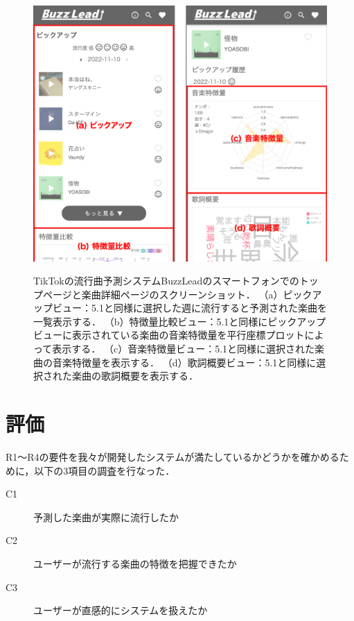 \documentclass[titlepage]{jsreport}
\begin{document}
\begin{figure}[htb]
\begin{center}
\includegraphics[width=120mm]{images/BuzzLead_sp.png}
\label{fig:smartphon}
\caption{
  TikTokの流行曲予測システムBuzzLeadのスマートフォンでのトップページと楽曲詳細ページのスクリーンショット．
  （a）ピックアップビュー：5.1と同様に選択した週に流行すると予測された楽曲を一覧表示する．
  （b）特徴量比較ビュー：5.1と同様にピックアップビューに表示されている楽曲の音楽特徴量を平行座標プロットによって表示する．
  （c）音楽特徴量ビュー：5.1と同様に選択された楽曲の音楽特徴量を表示する．
  （d）歌詞概要ビュー：5.1と同様に選択された楽曲の歌詞概要を表示する．
}
\end{center}
\end{figure}



\chapter{評価}
R1〜R4の要件を我々が開発したシステムが満たしているかどうかを確かめるために，以下の3項目の調査を行なった．
\begin{description}
\item [C1] 予測した楽曲が実際に流行したか
\item [C2] ユーザーが流行する楽曲の特徴を把握できたか
\item [C3] ユーザーが直感的にシステムを扱えたか
\end{description}
\end{document}
